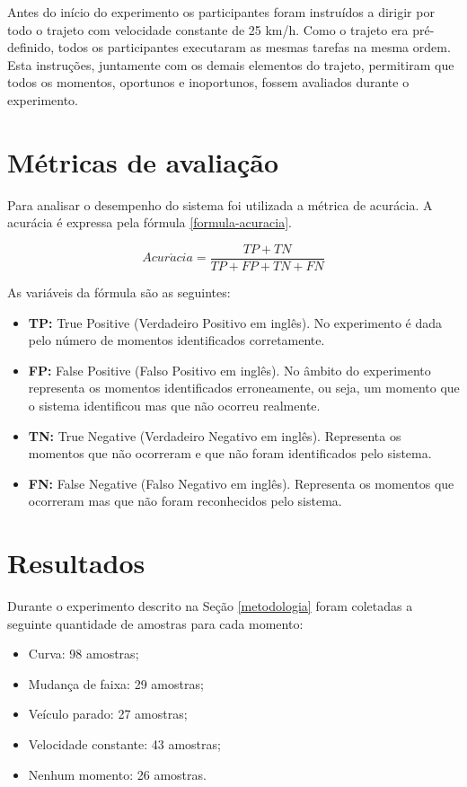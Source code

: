 Antes do início do experimento os participantes foram instruídos a dirigir por todo o trajeto com
velocidade constante de 25 km/h. Como o trajeto era pré-definido, todos os participantes executaram
as mesmas tarefas na mesma ordem. Esta instruções, juntamente com os demais elementos do trajeto,
permitiram que todos os momentos, oportunos e inoportunos, fossem avaliados durante o experimento.

\section{Métricas de avaliação}
\label{metricas}

Para analisar o desempenho do sistema foi utilizada a métrica de acurácia. A acurácia é expressa pela
fórmula \ref{formula-acuracia}.

\begin{equation}
  Acur\acute{a}cia = \frac{TP + TN}{TP + FP + TN + FN}
\label{formula-acuracia}
\end{equation}

As variáveis da fórmula são as seguintes:

\begin{itemize}
  \item \textbf{TP:} True Positive (Verdadeiro Positivo em inglês). No experimento é dada pelo número de
  momentos identificados corretamente.
  \item \textbf{FP:} False Positive (Falso Positivo em inglês). No âmbito do experimento representa os
  momentos identificados erroneamente, ou seja, um momento que o sistema identificou mas que não ocorreu
  realmente.
  \item \textbf{TN:} True Negative (Verdadeiro Negativo em inglês). Representa os momentos que não ocorreram
  e que não foram identificados pelo sistema.
  \item \textbf{FN:} False Negative (Falso Negativo em inglês). Representa os momentos que ocorreram mas
  que não foram reconhecidos pelo sistema.
\end{itemize}

\section{Resultados}
\label{resultados}

Durante o experimento descrito na Seção \ref{metodologia} foram coletadas a seguinte quantidade de amostras para cada momento:

\begin{itemize}
  \item Curva: 98 amostras;
  \item Mudança de faixa: 29 amostras;
  \item Veículo parado: 27 amostras;
  \item Velocidade constante: 43 amostras;
  \item Nenhum momento: 26 amostras.
\end{itemize}

